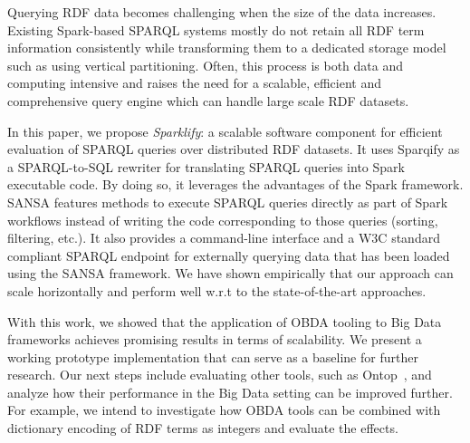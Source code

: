 
Querying RDF data becomes challenging when the size of the data increases.
Existing Spark-based SPARQL systems mostly
do not retain all RDF term information consistently while transforming them to a dedicated storage model such as using vertical partitioning.
Often, this process is both data and computing intensive and raises the need for a scalable, efficient and comprehensive query engine which can handle large scale RDF datasets.

In this paper, we propose \emph{Sparklify}: a scalable software component for efficient evaluation of SPARQL queries over distributed RDF datasets.
It uses Sparqify as a SPARQL-to-SQL rewriter for translating SPARQL queries into Spark executable code.
By doing so, it leverages the advantages of the Spark framework.
SANSA features methods to execute SPARQL queries directly as part of Spark workflows instead of writing the code corresponding to those queries (sorting, filtering, etc.).
It also provides a command-line interface and a W3C standard compliant SPARQL endpoint for externally querying data that has been loaded using the SANSA framework.
We have shown empirically that our approach can scale horizontally and perform well w.r.t to the state-of-the-art approaches.

With this work, we showed that the application of OBDA tooling to Big Data frameworks achieves promising results in terms of scalability.
We present a working prototype implementation that can serve as a baseline for further research.
Our next steps include evaluating other tools, such as Ontop~\cite{Calvanese2017OntopAS}, and analyze how their performance in the Big Data setting can be improved further.
For example, we intend to investigate how OBDA tools can be combined with dictionary encoding of RDF terms as integers and evaluate the effects.

